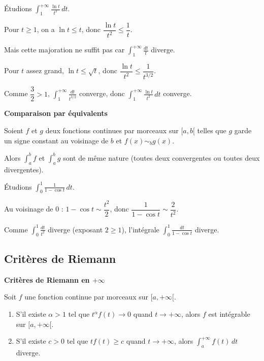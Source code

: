 \documentclass[../PolyS4.tex]{subfiles}
\begin{document}
\begin{Ex}
Étudions $\displaystyle\int_{1}^{+\infty} \frac{\ln t}{t^2} \, dt$.

Pour $t \geq 1$, on a $\ln t \leq t$, donc $\dfrac{\ln t}{t^2} \leq \dfrac{1}{t}$.

Mais cette majoration ne suffit pas car $\displaystyle\int_{1}^{+\infty} \frac{dt}{t}$ diverge.

Pour $t$ assez grand, $\ln t \leq \sqrt{t}$, donc $\dfrac{\ln t}{t^2} \leq \dfrac{1}{t^{3/2}}$.

Comme $\dfrac{3}{2} > 1$, $\displaystyle\int_{1}^{+\infty} \frac{dt}{t^{3/2}}$ converge, donc $\displaystyle\int_{1}^{+\infty} \frac{\ln t}{t^2} \, dt$ converge.
\end{Ex}

\begin{Thm}
\textbf{Comparaison par équivalents}

Soient $f$ et $g$ deux fonctions continues par morceaux sur $[a, b[$ telles que $g$ garde un signe constant au voisinage de $b$ et $f(x) \sim_{b} g(x)$.

Alors $\displaystyle\int_{a}^{b} f$ et $\displaystyle\int_{a}^{b} g$ sont de même nature (toutes deux convergentes ou toutes deux divergentes).
\end{Thm}

\begin{Ex}
Étudions $\displaystyle\int_{0}^{1} \frac{1}{1 - \cos t} \, dt$.

Au voisinage de $0$ : $1 - \cos t \sim \dfrac{t^2}{2}$, donc $\dfrac{1}{1 - \cos t} \sim \dfrac{2}{t^2}$.

Comme $\displaystyle\int_{0}^{1} \frac{dt}{t^2}$ diverge (exposant $2 \geq 1$), l'intégrale $\displaystyle\int_{0}^{1} \frac{dt}{1 - \cos t}$ diverge.
\end{Ex}

\newpage

\subsection{Critères de Riemann}

\begin{Thm}
\textbf{Critères de Riemann en $+\infty$}

Soit $f$ une fonction continue par morceaux sur $[a, +\infty[$.

\begin{enumerate}
\item S'il existe $\alpha > 1$ tel que $t^{\alpha} f(t) \to 0$ quand $t \to +\infty$, alors $f$ est intégrable sur $[a, +\infty[$.

\item S'il existe $c > 0$ tel que $t f(t) \geq c$ quand $t \to +\infty$, alors $\displaystyle\int_{a}^{+\infty} f(t) \, dt$ diverge.
\end{enumerate}
\end{Thm}
\end{document}
